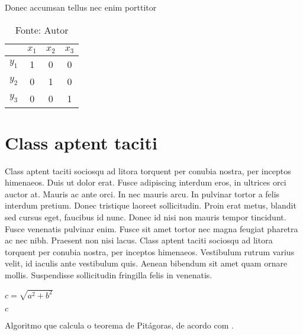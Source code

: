 \begin{table}[ht!]
	\caption{Donec accumsan tellus nec enim porttitor} \label{tbl:exemplo}
	\centering
	\begin{tabular}{|c|c|c|c|}
		\hline
		        & \(x_1\) & \(x_2\) & \(x_3\) \\
		\hline
		\(y_1\) & 1       & 0       & 0       \\
		\hline
		\(y_2\) & 0       & 1       & 0       \\
		\hline
		\(y_3\) & 0       & 0       & 1       \\
		\hline
	\end{tabular}
	\caption*{Fonte: Autor}
\end{table}

\section{Class aptent taciti}

Class aptent taciti sociosqu ad litora torquent per conubia nostra, per  inceptos himenaeos. Duis ut dolor erat. Fusce adipiscing interdum eros, in ultrices orci auctor at. Mauris ac ante orci. In nec mauris arcu. In pulvinar tortor a felis interdum pretium. Donec tristique laoreet sollicitudin. Proin erat metus, blandit sed cursus eget, faucibus id nunc. Donec id nisi non mauris tempor tincidunt. Fusce venenatis pulvinar enim. Fusce sit amet tortor nec magna feugiat pharetra ac nec nibh. Praesent non nisi lacus. Class aptent taciti sociosqu ad litora torquent per conubia nostra, per inceptos himenaeos. Vestibulum rutrum varius velit, id iaculis ante vestibulum quis. Aenean bibendum sit amet quam ornare mollis. Suspendisse sollicitudin fringilla felis in venenatis.

\begin{algorithm}

	\(c=\sqrt{a^2 + b^2}\)

	\Retorna \(c\)

	\caption{Algoritmo que calcula o teorema de Pitágoras, de acordo com \textcite{heath1921history}.}
	\label{lst:alg}
\end{algorithm}